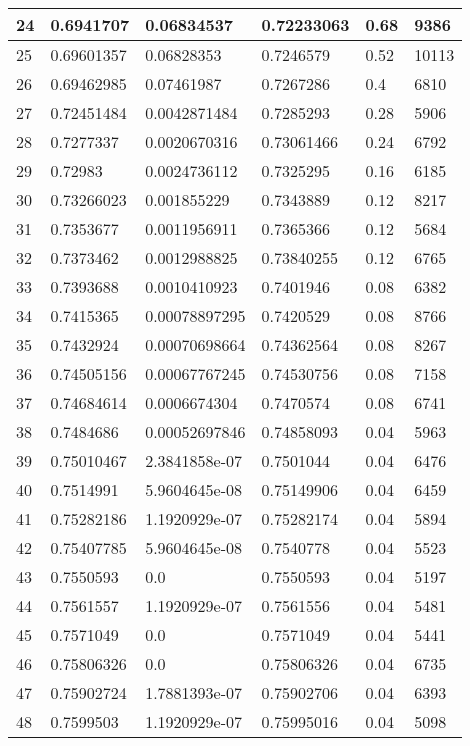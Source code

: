 \begin{longtable}{|l|l|l|l|l|l|}
24 & 0.6941707 & 0.06834537 & 0.72233063 & 0.68 & 9386 \\ \hline 
25 & 0.69601357 & 0.06828353 & 0.7246579 & 0.52 & 10113 \\ \hline 
26 & 0.69462985 & 0.07461987 & 0.7267286 & 0.4 & 6810 \\ \hline 
27 & 0.72451484 & 0.0042871484 & 0.7285293 & 0.28 & 5906 \\ \hline 
28 & 0.7277337 & 0.0020670316 & 0.73061466 & 0.24 & 6792 \\ \hline 
29 & 0.72983 & 0.0024736112 & 0.7325295 & 0.16 & 6185 \\ \hline 
30 & 0.73266023 & 0.001855229 & 0.7343889 & 0.12 & 8217 \\ \hline 
31 & 0.7353677 & 0.0011956911 & 0.7365366 & 0.12 & 5684 \\ \hline 
32 & 0.7373462 & 0.0012988825 & 0.73840255 & 0.12 & 6765 \\ \hline 
33 & 0.7393688 & 0.0010410923 & 0.7401946 & 0.08 & 6382 \\ \hline 
34 & 0.7415365 & 0.00078897295 & 0.7420529 & 0.08 & 8766 \\ \hline 
35 & 0.7432924 & 0.00070698664 & 0.74362564 & 0.08 & 8267 \\ \hline 
36 & 0.74505156 & 0.00067767245 & 0.74530756 & 0.08 & 7158 \\ \hline 
37 & 0.74684614 & 0.0006674304 & 0.7470574 & 0.08 & 6741 \\ \hline 
38 & 0.7484686 & 0.00052697846 & 0.74858093 & 0.04 & 5963 \\ \hline 
39 & 0.75010467 & 2.3841858e-07 & 0.7501044 & 0.04 & 6476 \\ \hline 
40 & 0.7514991 & 5.9604645e-08 & 0.75149906 & 0.04 & 6459 \\ \hline 
41 & 0.75282186 & 1.1920929e-07 & 0.75282174 & 0.04 & 5894 \\ \hline 
42 & 0.75407785 & 5.9604645e-08 & 0.7540778 & 0.04 & 5523 \\ \hline 
43 & 0.7550593 & 0.0 & 0.7550593 & 0.04 & 5197 \\ \hline 
44 & 0.7561557 & 1.1920929e-07 & 0.7561556 & 0.04 & 5481 \\ \hline 
45 & 0.7571049 & 0.0 & 0.7571049 & 0.04 & 5441 \\ \hline 
46 & 0.75806326 & 0.0 & 0.75806326 & 0.04 & 6735 \\ \hline 
47 & 0.75902724 & 1.7881393e-07 & 0.75902706 & 0.04 & 6393 \\ \hline 
48 & 0.7599503 & 1.1920929e-07 & 0.75995016 & 0.04 & 5098 \\ \hline 

\end{longtable}
